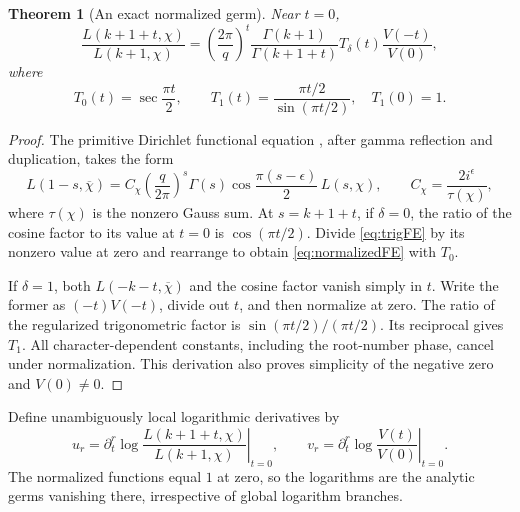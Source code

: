 \documentclass[11pt]{article}
\newtheorem{theorem}{Theorem}[section]
\theoremstyle{definition}
\theoremstyle{remark}
\begin{document}
\begin{theorem}[An exact normalized germ]\label{thm:normalizedFE}
Near $t=0$,
\begin{equation}\label{eq:normalizedFE}
 \frac{L(k+1+t,\chi)}{L(k+1,\chi)}
   =\left(\frac{2\pi}{q}\right)^t
      \frac{\Gamma(k+1)}{\Gamma(k+1+t)}
      T_\delta(t)\frac{V(-t)}{V(0)},
\end{equation}
where
\begin{equation}\label{eq:Tdelta}
 T_0(t)=\sec\frac{\pi t}{2},\qquad
 T_1(t)=\frac{\pi t/2}{\sin(\pi t/2)},\quad T_1(0)=1.
\end{equation}
\end{theorem}
\begin{proof}
The primitive Dirichlet functional equation \cite{DLMFL}, after gamma reflection and duplication, takes the form
\begin{equation}\label{eq:trigFE}
 L(1-s,\overline\chi)=C_\chi
       \left(\frac{q}{2\pi}\right)^s\Gamma(s)
       \cos\frac{\pi(s-\epsilon)}2\,L(s,\chi),
 \qquad C_\chi=\frac{2i^\epsilon}{\tau(\chi)},
\end{equation}
where $\tau(\chi)$ is the nonzero Gauss sum. At $s=k+1+t$, if $\delta=0$, the ratio of the cosine factor to its value at $t=0$ is $\cos(\pi t/2)$. Divide \eqref{eq:trigFE} by its nonzero value at zero and rearrange to obtain \eqref{eq:normalizedFE} with $T_0$.

If $\delta=1$, both $L(-k-t,\overline\chi)$ and the cosine factor vanish simply in $t$. Write the former as $(-t)V(-t)$, divide out $t$, and then normalize at zero. The ratio of the regularized trigonometric factor is $\sin(\pi t/2)/(\pi t/2)$. Its reciprocal gives $T_1$. All character-dependent constants, including the root-number phase, cancel under normalization. This derivation also proves simplicity of the negative zero and $V(0)\neq0$.
\end{proof}

Define unambiguously local logarithmic derivatives by
\begin{equation}\label{eq:uv}
 u_r=\left.\partial_t^r\log\frac{L(k+1+t,\chi)}{L(k+1,\chi)}\right|_{t=0},
 \qquad
 v_r=\left.\partial_t^r\log\frac{V(t)}{V(0)}\right|_{t=0}.
\end{equation}
The normalized functions equal $1$ at zero, so the logarithms are the analytic germs vanishing there, irrespective of global logarithm branches.
\end{document}
